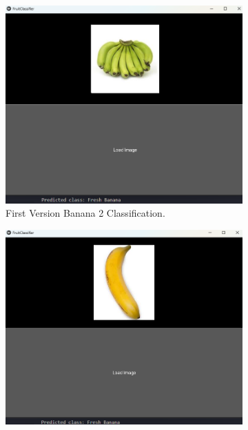 \documentclass[conference]{IEEEtran}
\begin{document}
\begin{figure}[h]
\begin{subfigure}[b]{0.48\linewidth}
        \label{figFA}
    \end{subfigure}
    \hfill
    \begin{subfigure}[b]{0.48\linewidth}
        \centering
        \includegraphics[width=\linewidth]{1layer banana2.png}
        \caption{First Version Banana 2 Classification.}
        \label{figFB}
    \end{subfigure}
    \hfill
    \begin{subfigure}[b]{0.48\linewidth}
        \centering
        \includegraphics[width=\linewidth]{1layer banana3.png}

\end{subfigure}
\end{figure}
\end{document}
